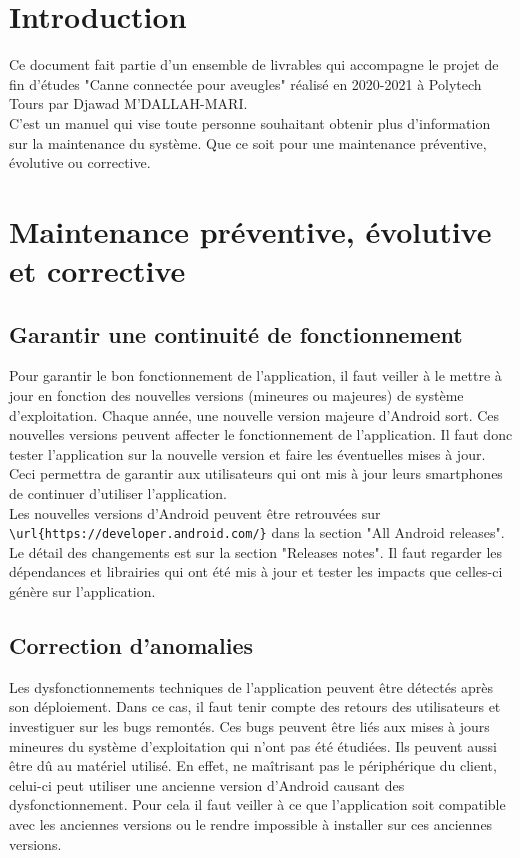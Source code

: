 \documentclass[UTF8]{EPURapport}
\begin{document}
\chapter{Introduction}

Ce document fait partie d'un ensemble de livrables qui accompagne le projet de fin d'études "Canne connectée pour aveugles" réalisé en 2020-2021 à Polytech Tours par Djawad M'DALLAH-MARI.\\

C'est un manuel qui vise toute personne souhaitant obtenir plus d'information sur la maintenance du système. Que ce soit pour une maintenance préventive, évolutive ou corrective.

\chapter{Maintenance préventive, évolutive et corrective}
\section{Garantir une continuité de fonctionnement}
Pour garantir le bon fonctionnement de l'application, il faut veiller à le mettre à jour en fonction des nouvelles versions (mineures ou majeures) de système d'exploitation. Chaque année, une nouvelle version majeure d'Android sort. Ces nouvelles versions peuvent affecter le fonctionnement de l'application. Il faut donc tester l'application sur la nouvelle version et faire les éventuelles mises à jour. Ceci permettra de garantir aux utilisateurs qui ont mis à jour leurs smartphones de continuer d'utiliser l'application.\\

Les nouvelles versions d'Android peuvent être retrouvées sur  \verb|\url{https://developer.android.com/}| dans la section "All Android releases". Le détail des changements est sur la section "Releases notes". Il faut regarder les dépendances et librairies qui ont été mis à jour et tester les impacts que celles-ci génère sur l'application.

\section{Correction d'anomalies}
Les dysfonctionnements techniques de l'application peuvent être détectés après son déploiement. Dans ce cas, il faut tenir compte des retours des utilisateurs et investiguer sur les bugs remontés. Ces bugs peuvent être liés aux mises à jours mineures du système d'exploitation qui n'ont pas été étudiées. Ils peuvent aussi être dû au matériel utilisé. En effet, ne maîtrisant pas le périphérique du client, celui-ci peut utiliser une ancienne version d'Android causant des dysfonctionnement. Pour cela il faut veiller à ce que l'application soit compatible avec les anciennes versions ou le rendre impossible à installer sur ces anciennes versions.
\end{document}
